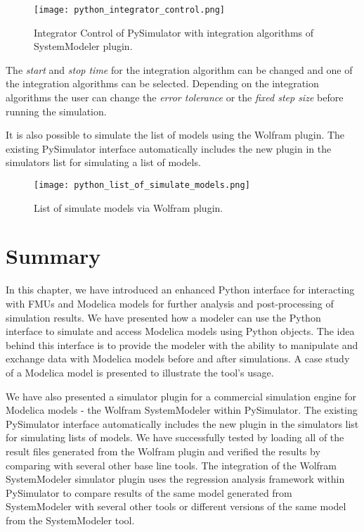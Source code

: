 \begin{figure}
	\texttt{[image: python\_integrator\_control.png]}
	\caption{Integrator Control of PySimulator with integration algorithms of SystemModeler plugin.}
	\label{fig:pythonintegratorcontrol}
\end{figure}

The \textit{start} and \textit{stop time} for the integration algorithm can be changed and one of the integration algorithms
can be selected. Depending on the integration algorithms the user can change the \textit{error tolerance} or the \textit{fixed step size}
before running the simulation.

It is also possible to simulate the list of models using the Wolfram plugin. The existing PySimulator interface automatically 
includes the new plugin in the simulators list for simulating a list of models.

\begin{landscape}
\begin{figure}
	\texttt{[image: python\_list\_of\_simulate\_models.png]}
	\caption{List of simulate models via Wolfram plugin.}
	\label{fig:pythonlistofsimulatemodels}
\end{figure}
\end{landscape}

\section{Summary}
\label{sec:pythonsummary}

In this chapter, we have introduced an enhanced Python interface for interacting with FMUs and Modelica models for further analysis and post-processing of simulation results. We have presented how a modeler can use the Python interface to simulate and access Modelica models using Python objects. The idea behind this interface is to provide the modeler with the ability to manipulate and exchange data with Modelica models before and after simulations. A case study of a Modelica model is presented to illustrate the tool’s usage.

We have also presented a simulator plugin for a commercial simulation engine for Modelica models - the Wolfram SystemModeler within PySimulator. The existing PySimulator interface automatically includes the new plugin in the simulators list for simulating lists of models. We have successfully tested by loading all of the result files generated from the Wolfram plugin and verified the results by comparing with several other base line tools. The integration of the Wolfram SystemModeler simulator plugin uses the regression analysis framework within PySimulator to compare results of the same model generated from SystemModeler with several other tools or different versions of the same model from the SystemModeler tool.

